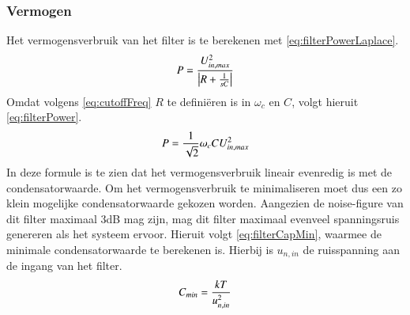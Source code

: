 
\subsubsection{Vermogen}
Het vermogensverbruik van het filter is te berekenen met \cref{eq:filterPowerLaplace}.
\begin{equation} \label{eq:filterPowerLaplace}
    P = \frac{U_{in,max}^2}{\left|R + \frac{1}{sC}\right|}
    \tagaddtext{[\si{\watt}]}
\end{equation}
Omdat volgens \cref{eq:cutoffFreq} $R$ te definiëren is in $\omega_c$ en $C$, volgt hieruit \cref{eq:filterPower}.
\begin{equation} \label{eq:filterPower}
    P = \frac{1}{\sqrt{2}}\omega_cCU_{in,max}^2
    \tagaddtext{[\si{\watt}]}
\end{equation}
In deze formule is te zien dat het vermogensverbruik lineair evenredig is met de condensatorwaarde. Om het vermogensverbruik te minimaliseren moet dus een zo klein mogelijke condensatorwaarde gekozen worden. Aangezien de noise-figure van dit filter maximaal 3dB mag zijn, mag dit filter maximaal evenveel spanningsruis genereren als het systeem ervoor. Hieruit volgt \cref{eq:filterCapMin}, waarmee de minimale condensatorwaarde te berekenen is. Hierbij is $u_{n,in}$ de ruisspanning aan de ingang van het filter.
\begin{equation} \label{eq:filterCapMin}
    C_{min} = \frac{kT}{u_{n,in}^2}
    \tagaddtext{[\si{\farad}]}
\end{equation}